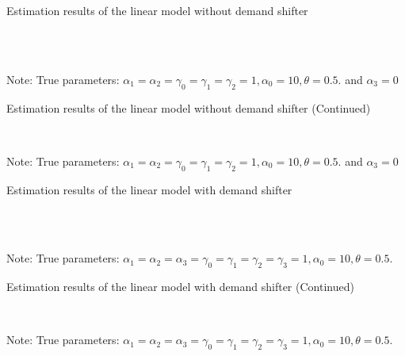 \documentclass[11pt, a4paper]{article}
\begin{document}
\begin{table}[!htbp]
  \begin{center}
      \caption{Estimation results of the linear model without demand shifter}
      \label{tb:linear_linear_sigma_1_without_demand_shifter_y} 
      \subfloat[$\sigma=0.001$]{}\\
      \subfloat[$\sigma=0.5$]{}\\
  \end{center}\footnotesize
  Note: True parameters: $\alpha_1 = \alpha_2 =  \gamma_0 = \gamma_1 = \gamma_2  =  1, \alpha_0 = 10, \theta = 0.5.$ and $\alpha_3 =0$
\end{table} 

\begin{table}[!htbp]
  \ContinuedFloat
  \begin{center}
      \caption{Estimation results of the linear model without demand shifter (Continued)}
      \subfloat[$\sigma=1.0$]{}\\
    \subfloat[$\sigma=2.0$]{}
  \end{center}\footnotesize
  Note: True parameters: $\alpha_1 = \alpha_2 =  \gamma_0 = \gamma_1 = \gamma_2  =  1, \alpha_0 = 10, \theta = 0.5.$ and $\alpha_3 =0$
\end{table} 

\begin{table}[!htbp]
  \begin{center}
      \caption{Estimation results of the linear model with demand shifter}
      \label{tb:linear_linear_sigma_1} 
      \subfloat[$\sigma=0.001$]{}\\
      \subfloat[$\sigma=0.5$]{}\\
  \end{center}\footnotesize
  Note: True parameters: $\alpha_1 = \alpha_2 = \alpha_3 = \gamma_0 = \gamma_1 = \gamma_2  = \gamma_3 = 1, \alpha_0 = 10, \theta = 0.5.$
\end{table} 

\begin{table}[!htbp]
  \ContinuedFloat
  \begin{center}
      \caption{Estimation results of the linear model with demand shifter (Continued)}
      \subfloat[$\sigma=1.0$]{}\\
    \subfloat[$\sigma=2.0$]{}
  \end{center}\footnotesize
  Note: True parameters: $\alpha_1 = \alpha_2 = \alpha_3 = \gamma_0 = \gamma_1 = \gamma_2  = \gamma_3 = 1, \alpha_0 = 10, \theta = 0.5.$
\end{table} 
\end{document}
